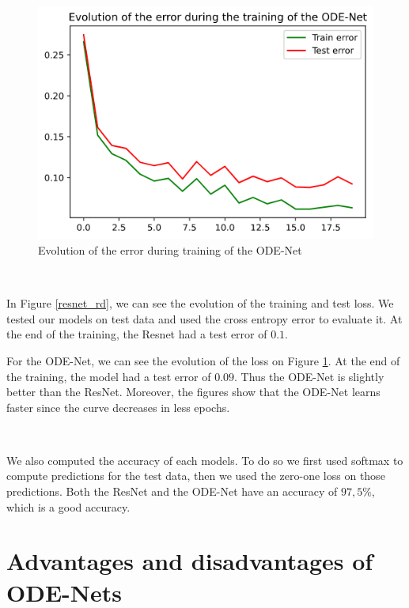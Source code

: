 \documentclass[10pt,a4paper]{article}
\theoremstyle{definition}
\theoremstyle{plain}
\begin{document}
\begin{figure}[!h]
\center
\includegraphics[scale=0.5]{odenet_rd_loss.png}
\caption{Evolution of the error during training of the ODE-Net}
\label{odenet_rd}
\end{figure}

~

In Figure \ref{resnet_rd}, we can see the evolution of the training and test loss. We tested our models on test data and used the cross entropy error to evaluate it. At the end of the training, the Resnet had a test error of $0.1$.

For the ODE-Net, we can see the evolution of the loss on Figure \ref{odenet_rd}. At the end of the training, the model had a test error of $0.09$. Thus the ODE-Net is slightly better than the ResNet. Moreover, the figures show that the ODE-Net learns faster since the curve decreases in less epochs.

~

We also computed the accuracy of each models. To do so we first used softmax to compute predictions for the test data, then we used the zero-one loss on those predictions. Both the ResNet and the ODE-Net have an accuracy of $97,5\%$, which is a good accuracy.


\section{Advantages and disadvantages of ODE-Nets}
\end{document}
